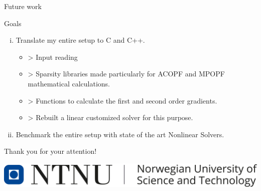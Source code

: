 \documentclass{beamer}
\begin{document}


\begin{frame}[plain]

\end{frame}

%


\begin {frame}{Future work}
\begin{block}{{Goals}}
\begin{enumerate}[i.]
\item <1->{Translate my entire setup to C and C++.
\begin{itemize}
\item > Input reading
\item > Sparsity libraries made particularly for ACOPF and MPOPF mathematical calculations.
\item > Functions to calculate the first and second order gradients.
\item > Rebuilt a linear customized solver for this purpose.
\end{itemize}
}
\item <2-> Benchmark the entire setup with state of the art Nonlinear Solvers.
\end{enumerate}
\end{block}
\end{frame}
%
\begin{frame}
\centering
Thank you for your attention!\\
		\vskip 0.8cm

\centering
\includegraphics[scale=0.2]{ntnulogo_eng.png}
\end{frame} 
\end{document}
